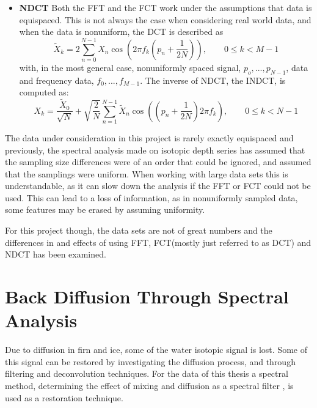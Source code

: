 \documentclass[../../CompleteThesis2/Complete_2ndDraft]{subfiles}
\begin{document}
\begin{itemize}
	
	\item \textbf{NDCT} Both the FFT and the FCT work under the assumptions that data is equispaced. This is not always the case when considering real world data, and when the data is nonuniform, the DCT is described as 
	\begin{equation}
		\tilde{X}_k = 2\sum_{n=0}^{N-1}X_n \cos\left(2\pi f_k\left(p_n + \frac{1}{2N}\right)\right), \qquad 0 \leq k < M-1
		\label{Eq:NDCT}
	\end{equation}
	with, in the most general case, nonuniformly spaced signal, $p_o,...,p_{N-1}$, data and frequency data, $f_0,...,f_{M-1}$.
	The inverse of NDCT, the INDCT, is computed as:
	\begin{equation}
		X_k = \frac{\tilde{X}_0}{\sqrt{N}} + \sqrt{\frac{2}{N}}\sum_{n=1}^{N-1} \tilde{X}_n \cos\left(\left(p_n + \frac{1}{2N}\right)2\pi f_k\right), \qquad 0 \leq k < N -1
		\label{Eq:INDCT}
	\end{equation}
\end{itemize}

The data under consideration in this project is rarely exactly equispaced and previously, the spectral analysis made on isotopic depth series has assumed that the sampling size differences were of an order that could be ignored, and assumed that the samplings were uniform.  When working with large data sets this is understandable, as it can slow down the analysis if the FFT or FCT could not be used. This can lead to a loss of information, as in nonuniformly sampled data, some features may be erased by assuming uniformity. 

For this project though, the data sets are not of great numbers and the differences in and effects of using FFT, FCT(mostly just referred to as DCT) and NDCT has been examined.


\section[Back Diffusion][Back Diffusion]{Back Diffusion Through Spectral Analysis}
\label{Sec:SignalAnalysis_BackDiffusion}
Due to diffusion in firn and ice, some of the water isotopic signal is lost. Some of this signal can be restored by investigating the diffusion process, and through filtering and deconvolution techniques.
For the data of this thesis a spectral method, determining the effect of mixing and diffusion as a spectral filter \cite[S.Johnsen et al., 2000]{Johnsen2000a}, \cite[S. Rasmussen et al., 2005]{Rasmussen2005} is used as a restoration technique. 
	
\end{document}
